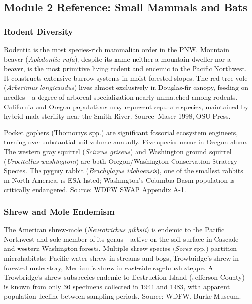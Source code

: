 \documentclass[11pt,letterpaper]{article}
\begin{document}
\subsection{Module 2 Reference: Small Mammals and Bats}

\subsubsection{Rodent Diversity}
Rodentia is the most species-rich mammalian order in the PNW. Mountain beaver (\textit{Aplodontia rufa}), despite its name neither a mountain-dweller nor a beaver, is the most primitive living rodent and endemic to the Pacific Northwest. It constructs extensive burrow systems in moist forested slopes. The red tree vole (\textit{Arborimus longicaudus}) lives almost exclusively in Douglas-fir canopy, feeding on needles---a degree of arboreal specialization nearly unmatched among rodents. California and Oregon populations may represent separate species, maintained by hybrid male sterility near the Smith River. Source: Maser 1998, OSU Press.

Pocket gophers (Thomomys spp.) are significant fossorial ecosystem engineers, turning over substantial soil volume annually. Five species occur in Oregon alone. The western gray squirrel (\textit{Sciurus griseus}) and Washington ground squirrel (\textit{Urocitellus washingtoni}) are both Oregon/Washington Conservation Strategy Species. The pygmy rabbit (\textit{Brachylagus idahoensis}), one of the smallest rabbits in North America, is ESA-listed; Washington's Columbia Basin population is critically endangered. Source: WDFW SWAP Appendix A-1.

\subsubsection{Shrew and Mole Endemism}
The American shrew-mole (\textit{Neurotrichus gibbsii}) is endemic to the Pacific Northwest and sole member of its genus---active on the soil surface in Cascade and western Washington forests. Multiple shrew species (\textit{Sorex} spp.) partition microhabitats: Pacific water shrew in streams and bogs, Trowbridge's shrew in forested understory, Merriam's shrew in east-side sagebrush steppe. A Trowbridge's shrew subspecies endemic to Destruction Island (Jefferson County) is known from only 36 specimens collected in 1941 and 1983, with apparent population decline between sampling periods. Source: WDFW, Burke Museum.
\end{document}
